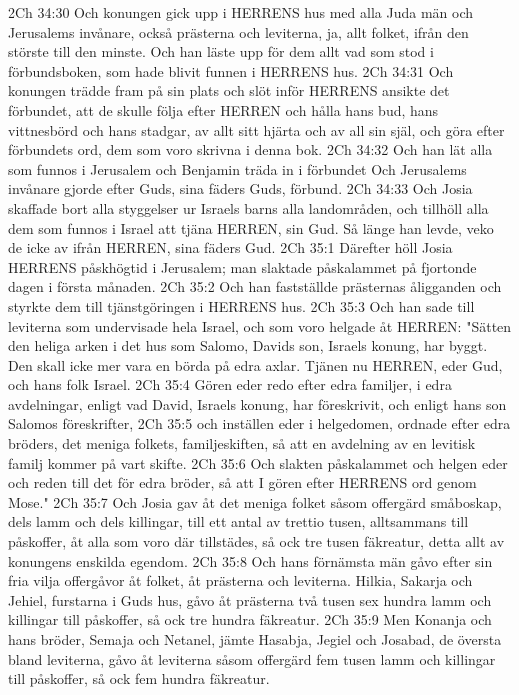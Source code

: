 2Ch 34:30  Och konungen gick upp i HERRENS hus med alla Juda män och Jerusalems invånare, också prästerna och leviterna, ja, allt folket, ifrån den störste till den minste. Och han läste upp för dem allt vad som stod i förbundsboken, som hade blivit funnen i HERRENS hus.
2Ch 34:31  Och konungen trädde fram på sin plats och slöt inför HERRENS ansikte det förbundet, att de skulle följa efter HERREN och hålla hans bud, hans vittnesbörd och hans stadgar, av allt sitt hjärta och av all sin själ, och göra efter förbundets ord, dem som voro skrivna i denna bok.
2Ch 34:32  Och han lät alla som funnos i Jerusalem och Benjamin träda in i förbundet Och Jerusalems invånare gjorde efter Guds, sina fäders Guds, förbund.
2Ch 34:33  Och Josia skaffade bort alla styggelser ur Israels barns alla landområden, och tillhöll alla dem som funnos i Israel att tjäna HERREN, sin Gud. Så länge han levde, veko de icke av ifrån HERREN, sina fäders Gud.
2Ch 35:1  Därefter höll Josia HERRENS påskhögtid i Jerusalem; man slaktade påskalammet på fjortonde dagen i första månaden.
2Ch 35:2  Och han fastställde prästernas åligganden och styrkte dem till tjänstgöringen i HERRENS hus.
2Ch 35:3  Och han sade till leviterna som undervisade hela Israel, och som voro helgade åt HERREN: "Sätten den heliga arken i det hus som Salomo, Davids son, Israels konung, har byggt. Den skall icke mer vara en börda på edra axlar. Tjänen nu HERREN, eder Gud, och hans folk Israel.
2Ch 35:4  Gören eder redo efter edra familjer, i edra avdelningar, enligt vad David, Israels konung, har föreskrivit, och enligt hans son Salomos föreskrifter,
2Ch 35:5  och inställen eder i helgedomen, ordnade efter edra bröders, det meniga folkets, familjeskiften, så att en avdelning av en levitisk familj kommer på vart skifte.
2Ch 35:6  Och slakten påskalammet och helgen eder och reden till det för edra bröder, så att I gören efter HERRENS ord genom Mose."
2Ch 35:7  Och Josia gav åt det meniga folket såsom offergärd småboskap, dels lamm och dels killingar, till ett antal av trettio tusen, alltsammans till påskoffer, åt alla som voro där tillstädes, så ock tre tusen fäkreatur, detta allt av konungens enskilda egendom.
2Ch 35:8  Och hans förnämsta män gåvo efter sin fria vilja offergåvor åt folket, åt prästerna och leviterna. Hilkia, Sakarja och Jehiel, furstarna i Guds hus, gåvo åt prästerna två tusen sex hundra lamm och killingar till påskoffer, så ock tre hundra fäkreatur.
2Ch 35:9  Men Konanja och hans bröder, Semaja och Netanel, jämte Hasabja, Jegiel och Josabad, de översta bland leviterna, gåvo åt leviterna såsom offergärd fem tusen lamm och killingar till påskoffer, så ock fem hundra fäkreatur.

